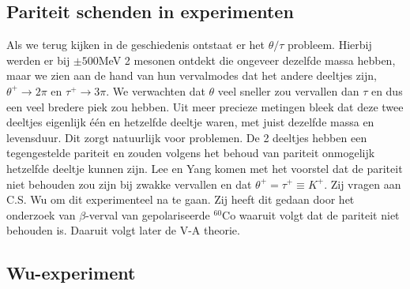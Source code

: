 \documentclass[../main.tex]{subfiles}
\begin{document}
\subsection{Pariteit schenden in experimenten}%
\label{sub:pariteit_schenden_in_experimenten}

Als we terug kijken in de geschiedenis ontstaat er het $\theta/\tau$ probleem. Hierbij werden er bij $\pm500$MeV 2 mesonen ontdekt die ongeveer dezelfde massa hebben, maar we zien aan de hand van hun vervalmodes dat het andere deeltjes zijn, $\theta^+\rightarrow 2\pi$ en $\tau^+\rightarrow 3\pi$. We verwachten dat $\theta$ veel sneller zou vervallen dan $\tau$ en dus een veel bredere piek zou hebben. Uit meer precieze metingen bleek dat deze twee deeltjes eigenlijk één en hetzelfde deeltje waren, met juist dezelfde massa en levensduur. Dit zorgt natuurlijk voor problemen. De 2 deeltjes hebben een tegengestelde pariteit en zouden volgens het behoud van pariteit onmogelijk hetzelfde deeltje kunnen zijn. Lee en Yang komen met het voorstel dat de pariteit niet behouden zou zijn bij zwakke vervallen en dat $\theta^+ = \tau^+ \equiv K^+$. Zij vragen aan C.S. Wu om dit experimenteel na te gaan. Zij heeft dit gedaan door het onderzoek van $\beta$-verval van gepolariseerde $^{60}$Co waaruit volgt dat de pariteit niet behouden is. Daaruit volgt later de V-A theorie.

\subsection{Wu-experiment}%
\label{sub:wu_experiment}
\end{document}
